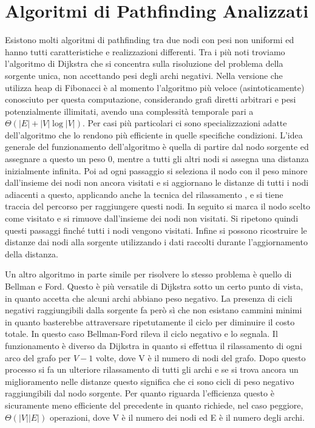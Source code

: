 \documentclass[12pt,a4paper]{report}
\begin{document}
\section{Algoritmi di Pathfinding Analizzati}\label{se:algo-path-anal}
Esistono molti algoritmi di pathfinding tra due nodi con pesi non uniformi ed hanno tutti caratteristiche e realizzazioni differenti. 
Tra i più noti troviamo l'algoritmo di Dijkstra che si concentra sulla risoluzione del problema della sorgente unica, non accettando pesi degli archi negativi. 
Nella versione che utilizza heap di Fibonacci è al momento l'algoritmo più veloce (asintoticamente) conosciuto per questa computazione, considerando grafi diretti arbitrari e pesi potenzialmente illimitati, avendo una complessità temporale pari a $\Theta (|E|+|V|\log |V|)$. 
Per casi più particolari ci sono specializzazioni adatte dell'algoritmo che lo rendono più efficiente in quelle specifiche condizioni. 
L'idea generale del funzionamento dell'algoritmo è quella di partire dal nodo sorgente ed assegnare a questo un peso 0, mentre a tutti gli altri nodi si assegna una distanza inizialmente infinita. 
Poi ad ogni passaggio si seleziona il nodo con il peso minore dall'insieme dei nodi non ancora visitati e si aggiornano le distanze di tutti i nodi adiacenti a questo, applicando anche la tecnica del rilassamento \cite{baeldungEdgeRelaxation}, e si tiene traccia del percorso per raggiungere questi nodi. 
In seguito si marca il nodo scelto come visitato e si rimuove dall'insieme dei nodi non visitati. 
Si ripetono quindi questi passaggi finché tutti i nodi vengono visitati. 
Infine si possono ricostruire le distanze dai nodi alla sorgente utilizzando i dati raccolti durante l'aggiornamento della distanza.

\medskip

Un altro algoritmo in parte simile per risolvere lo stesso problema è quello di Bellman e Ford. 
Questo è più versatile di Dijkstra sotto un certo punto di vista, in quanto accetta che alcuni archi abbiano peso negativo. 
La presenza di cicli negativi raggiungibili dalla sorgente fa però sì che non esistano cammini minimi in quanto basterebbe attraversare ripetutamente il ciclo per diminuire il costo totale. 
In questo caso Bellman-Ford rileva il ciclo negativo e lo segnala. 
Il funzionamento è diverso da Dijkstra in quanto si effettua il rilassamento di ogni arco del grafo per \(V-1\) volte, dove V è il numero di nodi del grafo. 
Dopo questo processo si fa un ulteriore rilassamento di tutti gli archi e se si trova ancora un miglioramento nelle distanze questo significa che ci sono cicli di peso negativo raggiungibili dal nodo sorgente.
Per quanto riguarda l'efficienza questo è sicuramente meno efficiente del precedente in quanto richiede, nel caso peggiore, $\Theta (|V||E|)$ operazioni, dove V è il numero dei nodi ed E è il numero degli archi.
\end{document}
